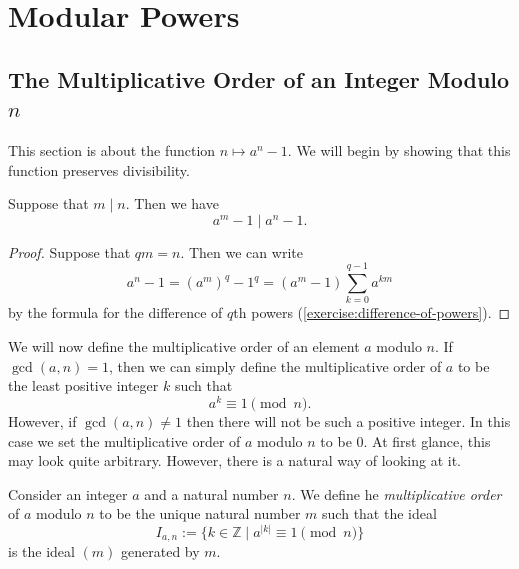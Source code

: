 \chapter{Modular Powers}

\section{The Multiplicative Order of an Integer Modulo $n$}

This section is about the function $n\mapsto a^n-1$. We will begin by showing that this function preserves divisibility.

\begin{proposition}
  Suppose that $m\mid n$. Then we have
  \begin{equation*}
    a^m-1\mid a^n-1.
  \end{equation*}
\end{proposition}

\begin{proof}
  Suppose that $qm=n$. Then we can write
  \begin{equation*}
    a^n-1 = (a^m)^{q} -1^q = (a^m-1)\sum_{k=0}^{q-1}a^{km}
  \end{equation*}
  by the formula for the difference of $q$th powers (\cref{exercise:difference-of-powers}).
\end{proof}

We will now define the multiplicative order of an element $a$ modulo $n$. If $\gcd(a,n)=1$, then we can simply define the multiplicative order of $a$ to be the least positive integer $k$ such that
\begin{equation*}
  a^k\equiv 1\pmod{n}.
\end{equation*}
However, if $\gcd(a,n)\neq 1$ then there will not be such a positive integer. In this case we set the multiplicative order of $a$ modulo $n$ to be $0$. At first glance, this may look quite arbitrary. However, there is a natural way of looking at it.

\begin{definition}
  Consider an integer $a$ and a natural number $n$. We define he \emph{multiplicative order} of $a$ modulo $n$ to be the unique natural number $m$ such that the ideal
  \begin{equation*}
    I_{a,n}:=\{k\in\mathbb{Z}\mid a^{|k|} \equiv 1\pmod{n}\}
  \end{equation*}
  is the ideal $(m)$ generated by $m$.
\end{definition}

